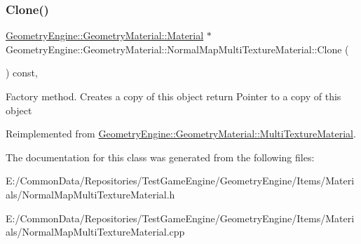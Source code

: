 \subsubsection{\texorpdfstring{Clone()}{Clone()}}
{\footnotesize\ttfamily \mbox{\hyperlink{class_geometry_engine_1_1_geometry_material_1_1_material}{Geometry\+Engine\+::\+Geometry\+Material\+::\+Material}} $\ast$ Geometry\+Engine\+::\+Geometry\+Material\+::\+Normal\+Map\+Multi\+Texture\+Material\+::\+Clone (\begin{DoxyParamCaption}{ }\end{DoxyParamCaption}) const\hspace{0.3cm}{\ttfamily [override]}, {\ttfamily [virtual]}}

Factory method. Creates a copy of this object return Pointer to a copy of this object 

Reimplemented from \mbox{\hyperlink{class_geometry_engine_1_1_geometry_material_1_1_multi_texture_material_a66cef99b68270e1399830bc1b8bc8502}{Geometry\+Engine\+::\+Geometry\+Material\+::\+Multi\+Texture\+Material}}.



The documentation for this class was generated from the following files\+:\begin{DoxyCompactItemize}
\item 
E\+:/\+Common\+Data/\+Repositories/\+Test\+Game\+Engine/\+Geometry\+Engine/\+Items/\+Materials/Normal\+Map\+Multi\+Texture\+Material.\+h\item 
E\+:/\+Common\+Data/\+Repositories/\+Test\+Game\+Engine/\+Geometry\+Engine/\+Items/\+Materials/Normal\+Map\+Multi\+Texture\+Material.\+cpp\end{DoxyCompactItemize}
